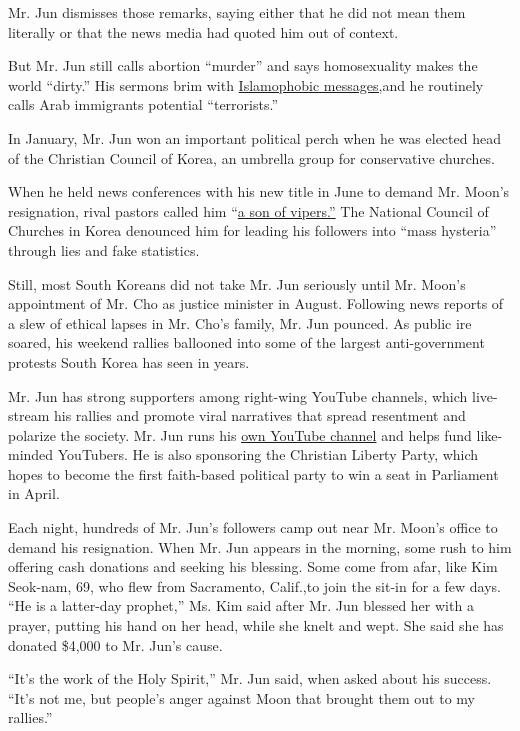 Mr. Jun dismisses those remarks, saying either that he did not mean them
literally or that the news media had quoted him out of context. ​

But ​Mr. Jun ​still ​calls abortion ``murder'' and says homosexuality
makes the world ``dirty.'' His sermons brim with
\href{https://www.youtube.com/watch?v=5ObAfx2ZuJ4\&list=UUQM0Zn_5zHh8zdGrfBbAekg\&index=14}{Islamophobic
messages,}and he routinely calls Arab immigrants potential
``terrorists.''

In January, Mr. Jun ​won an important political perch when he ​was
elected head of the Christian Council of Korea, ​an umbrella group for
conservative churches.

When he held news conferences with his new title in June to demand Mr.
Moon's resignation, rival pastors called him
``\href{https://www.youtube.com/watch?v=JyNeAT7LCQg}{a son of vipers.''}
The National Council of Churches in Korea denounced him for leading his
followers into ``mass hysteria'' through lies and fake statistics.

Still, most South Koreans did not take Mr. Jun seriously until Mr.
Moon's appointment of Mr. Cho as justice minister in August. Following
news reports of a slew of ethical lapses in Mr. Cho's family, Mr. Jun
pounced. As public ire soared, his weekend rallies ballooned into some
of the largest anti-government protests South Korea has seen in years.

Mr. Jun has strong supporters among right-wing YouTube channels, which
live-stream his rallies and promote viral narratives that spread
resentment and polarize​ the society​. Mr. Jun runs his
\href{http://youtube.com/channel/UC1qldNOqaqIY2PwhbVwIhWA}{own YouTube
channel} and helps fund like-minded YouTubers. He is also sponsoring the
Christian Liberty Party, which hopes to become the first faith-based
political party to win a seat in Parliament in April.

Each night, hundreds of Mr. Jun's followers camp out near Mr. Moon's
office to demand his resignation. When Mr. Jun appears in the morning,
some rush to him offering cash donations and seeking his blessing. Some
come from afar, like Kim Seok-nam, 69, ​who ​flew from Sacramento,
Calif., ​to join the sit-in for a few days. ``He is a latter-day
prophet​,'' Ms. Kim said after Mr. Jun blessed her with a prayer,
putting his hand on her head, while she knelt and wept​. She said she
has donated \$4,000 to Mr. Jun's cause.

``It's the work of the Holy Spirit,'' Mr. Jun said, when asked about his
success. ``It's not me, but people's anger against Moon that brought
them out to my rallies.''

